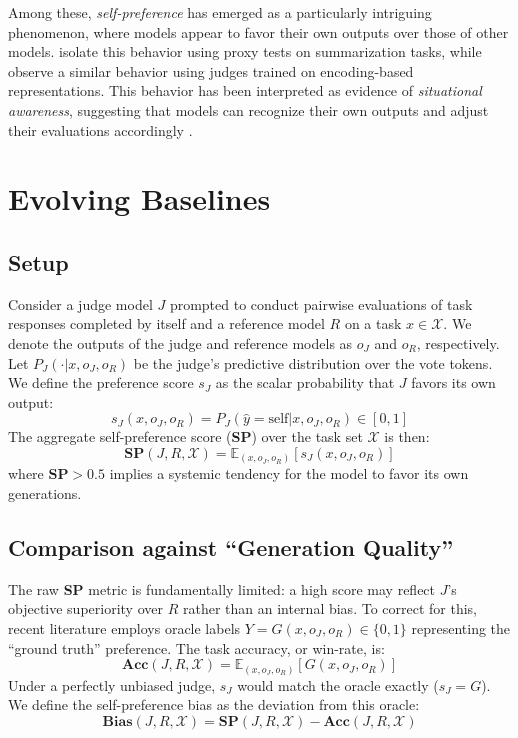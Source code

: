 \documentclass{article}
\theoremstyle{plain}
\theoremstyle{definition}
\theoremstyle{remark}
\begin{document}
Among these, \textit{self-preference} has emerged as a particularly intriguing phenomenon, where models appear to favor their own outputs over those of other models. \citet{panicksseryLLMEvaluatorsRecognize2024} isolate this behavior using proxy tests on summarization tasks, while \citet{liuLLMsNarcissisticEvaluators2024} observe a similar behavior using judges trained on encoding-based representations. This behavior has been interpreted as evidence of \textit{situational awareness}, suggesting that models can recognize their own outputs and adjust their evaluations accordingly \cite{laineSituationalAwarenessBenchmark2023}.

\section{Evolving Baselines}
\subsection{Setup}
\label{subsec:setup}
Consider a judge model \( J \) prompted to conduct pairwise evaluations of task responses completed by itself and a reference model \( R \) on a task \( x \in \mathcal{X} \). We denote the outputs of the judge and reference models as \( o_J \) and \( o_R \), respectively. Let $P_J(\cdot | x, o_J, o_R)$ be the judge's predictive distribution over the vote tokens. We define the preference score $s_J$ as the scalar probability that $J$ favors its own output:
\[ s_J(x, o_J, o_R) = P_J(\hat{y} = \text{self} | x, o_J, o_R) \in [0, 1] \]
The aggregate self-preference score (\textbf{SP}) over the task set $\mathcal{X}$ is then:
\[ \textbf{SP}(J, R, \mathcal{X}) = \mathbb{E}_{(x, o_J, o_R)} [s_J(x, o_J, o_R)] \]
where $\textbf{SP} > 0.5$ implies a systemic tendency for the model to favor its own generations.

\subsection{Comparison against ``Generation Quality''}
\label{subsec:genqual}
The raw \textbf{SP} metric is fundamentally limited: a high score may reflect $J$'s objective superiority over $R$ rather than an internal bias. To correct for this, recent literature employs oracle labels $Y = G(x, o_J, o_R) \in \{0, 1\}$ representing the ``ground truth'' preference. The task accuracy, or win-rate, is:
\[ \textbf{Acc}(J, R, \mathcal{X}) = \mathbb{E}_{(x, o_J, o_R)} [G(x, o_J, o_R)] \]
Under a perfectly unbiased judge, $s_J$ would match the oracle exactly ($s_J = G$). We define the self-preference bias as the deviation from this oracle:
\begin{equation}
\textbf{Bias}(J, R, \mathcal{X}) = \textbf{SP}(J,R,\mathcal{X}) - \textbf{Acc}(J, R, \mathcal{X})\label{eq:bias}
\end{equation}
\end{document}
